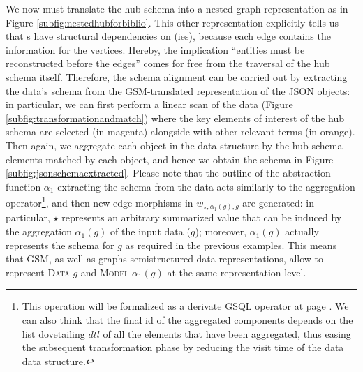 \begin{example}[continues=ex:examplegraphdata,label=ex:examplereferencedOcaml]
We now must translate the hub schema into a nested graph representation as in Figure \vref{subfig:nestedhubforbiblio}. This other representation explicitly tells us that \RELA s have structural dependencies on \ONTA(ies), because each edge contains the information for the vertices. Hereby, the implication ``entities must be reconstructed before the edges'' comes for free from the traversal of the hub schema itself. Therefore, the schema alignment can be carried out by extracting the data's schema from the GSM-translated representation of the JSON objects: in particular, we can first perform a linear scan of the data (Figure \vref{subfig:transformationandmatch}) where the key elements of interest of the hub schema are selected (in magenta) alongside with other relevant terms (in orange). Then again, we aggregate each object in the data structure by the hub schema elements matched by each object, and hence we obtain the schema in Figure \ref{subfig:jsonschemaextracted}. Please note that the outline of the abstraction function $\alpha_1$	 extracting the schema from the data acts similarly to the aggregation operator\footnote{This operation will be formalized as a derivate GSQL operator at page \pageref{abstractionAlpha1}. We can also think that the final id of the aggregated components depends on the list dovetailing $dtl$ of all the elements that have been aggregated, thus easing the subsequent transformation phase by reducing the visit time of the data data structure. }, and then new edge morphisms in $w_{\star,\alpha_1(g),g}$ are generated: in particular, $\star$ represents an arbitrary summarized value that can be induced by the aggregation $\alpha_1(g)$ of the input data ($g$); moreover, $\alpha_1(g)$ actually represents the schema for $g$ as required in the previous examples.  This means that GSM, as well as graphs semistructured data representations, allow to represent \textsc{Data} $g$ and \textsc{Model} $\alpha_1(g)$ at the same representation level.


\end{example}
